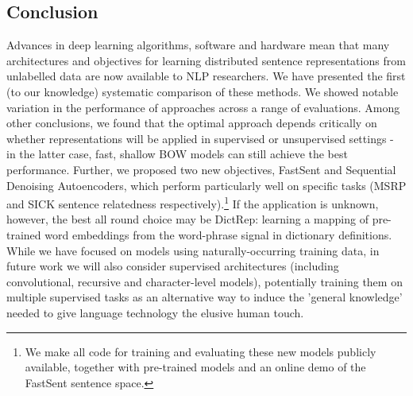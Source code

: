 \subsection{Conclusion}
Advances in deep learning algorithms, software and hardware mean that many architectures and objectives for learning distributed sentence representations from unlabelled data are now available to NLP researchers. We have presented the first (to our knowledge) systematic comparison of these methods. We showed notable variation in the performance of approaches across a range of evaluations. Among other conclusions, we found that the optimal approach depends critically on whether representations will be applied in supervised or unsupervised settings - in the latter case, fast, shallow BOW models can still achieve the best performance. Further, we proposed two new objectives, FastSent and Sequential Denoising Autoencoders, which perform particularly well on specific tasks (MSRP and SICK sentence relatedness respectively).\footnote{We make all code for training and evaluating these new models publicly available, together with pre-trained models and an online demo of the FastSent sentence space.} If the application is unknown, however, the best all round choice may be DictRep: learning a mapping of pre-trained word embeddings from the word-phrase signal in dictionary definitions. While we have focused on models using naturally-occurring training data, in future work we will also consider supervised architectures (including convolutional, recursive and character-level models), potentially training them on multiple supervised tasks as an alternative way to induce the 'general knowledge' needed to give language technology the elusive human touch. 